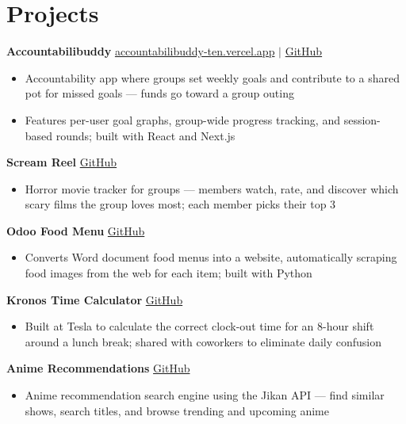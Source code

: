 \documentclass[letterpaper,10.5pt]{article}
\newcommand{\resumeItem}[1]{\item\small{#1}}
\begin{document}
\section{Projects}

\textbf{Accountabilibuddy} \hfill \href{https://accountabilibuddy-ten.vercel.app}{accountabilibuddy-ten.vercel.app} $|$ \href{https://github.com/birajkhatiwada/accountabilibuddy}{GitHub}
\begin{itemize}[leftmargin=0.15in, topsep=2pt, itemsep=0pt, parsep=0pt]
  \resumeItem{Accountability app where groups set weekly goals and contribute to a shared pot for missed goals — funds go toward a group outing}
  \resumeItem{Features per-user goal graphs, group-wide progress tracking, and session-based rounds; built with React and Next.js}
\end{itemize}

\vspace{3pt}
\textbf{Scream Reel} \hfill \href{https://github.com/birajkhatiwada/ScreamReel}{GitHub}
\begin{itemize}[leftmargin=0.15in, topsep=2pt, itemsep=0pt, parsep=0pt]
  \resumeItem{Horror movie tracker for groups — members watch, rate, and discover which scary films the group loves most; each member picks their top 3}
\end{itemize}

\vspace{3pt}
\textbf{Odoo Food Menu} \hfill \href{https://github.com/birajkhatiwada/OdooFoodMenu}{GitHub}
\begin{itemize}[leftmargin=0.15in, topsep=2pt, itemsep=0pt, parsep=0pt]
  \resumeItem{Converts Word document food menus into a website, automatically scraping food images from the web for each item; built with Python}
\end{itemize}

\vspace{3pt}
\textbf{Kronos Time Calculator} \hfill \href{https://github.com/birajkhatiwada/kronosTimeCalculator}{GitHub}
\begin{itemize}[leftmargin=0.15in, topsep=2pt, itemsep=0pt, parsep=0pt]
  \resumeItem{Built at Tesla to calculate the correct clock-out time for an 8-hour shift around a lunch break; shared with coworkers to eliminate daily confusion}
\end{itemize}

\vspace{3pt}
\textbf{Anime Recommendations} \hfill \href{https://github.com/birajkhatiwada/AnimeRecommendations}{GitHub}
\begin{itemize}[leftmargin=0.15in, topsep=2pt, itemsep=0pt, parsep=0pt]
  \resumeItem{Anime recommendation search engine using the Jikan API — find similar shows, search titles, and browse trending and upcoming anime}
\end{itemize}
\end{document}
